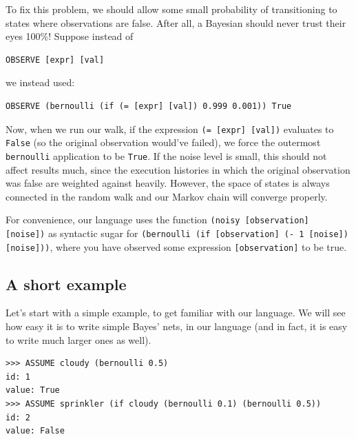 \documentclass[10pt]{article}
\begin{document}
To fix this problem, we should allow some small probability of transitioning to states where observations are false.  After all, a Bayesian should never trust their eyes 100\%!   Suppose instead of

\begin{leftbar} \begin{small} \begin{verbatim}
OBSERVE [expr] [val]
\end{verbatim} \end{small} \end{leftbar}

we instead used:

\begin{leftbar} \begin{small} \begin{verbatim}
OBSERVE (bernoulli (if (= [expr] [val]) 0.999 0.001)) True
\end{verbatim} \end{small} \end{leftbar}


Now, when we run our walk, if the expression {\tt (= [expr] [val])} evaluates to {\tt False} (so the original observation would've failed), we force the outermost {\tt bernoulli} application to be {\tt True}.   If the noise level is small, this should not affect results much, since the execution histories in which the original observation was false are weighted against heavily.  However, the space of states is always connected in the random walk and our Markov chain will converge properly.\vspace{6 pt}%

For convenience, our language uses the function {\tt (noisy [observation] [noise])} as syntactic sugar for 
{\tt (bernoulli (if [observation] (- 1 [noise]) [noise]))}, where you have observed some expression {\tt [observation]} to be true.  

\subsection{A short example}

Let's start with a simple example, to get familiar with our language.   We will see how easy it is to write simple Bayes' nets, in our language (and in fact, it is easy to write much larger ones as well).

\begin{leftbar} \begin{small} \begin{verbatim}
>>> ASSUME cloudy (bernoulli 0.5)
id: 1
value: True
>>> ASSUME sprinkler (if cloudy (bernoulli 0.1) (bernoulli 0.5))
id: 2
value: False
\end{verbatim} \end{small} \end{leftbar}
\end{document}
